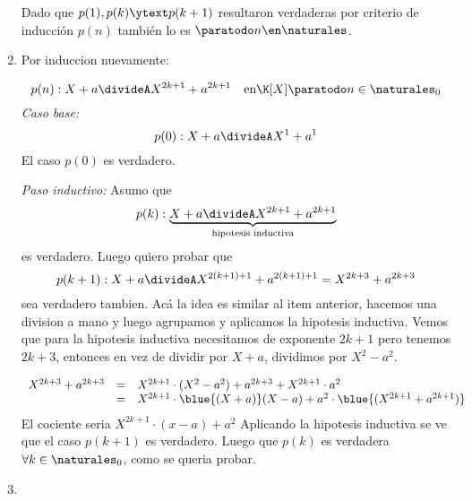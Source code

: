 \begin{enumerate}[label=\roman*)]
        \medskip

        Dado que $p(1), p(k) \ytext p(k+1)$ resultaron verdaderas por criterio de inducción $p(n)$ también lo es $\paratodo n \en \naturales$.

  \item Por induccion nuevamente:
  
          $$
           p(n): X + a \divideA X^{2k + 1} + a^{2k + 1} \quad \text{en} \K[X] \paratodo n \in \naturales_0
          $$
          \textit{Caso base:}
          $$
           p(0) : X + a \divideA X^1 + a^1
          $$
          El caso $p(0)$ es verdadero. 

          \textit{Paso inductivo: } 
          Asumo que
          $$
           p(k) : \underbrace{X + a \divideA X^{2k + 1} + a^{2k + 1}}_{\text{hipotesis inductiva}}
          $$
          es verdadero. Luego quiero probar que 
          $$
           p(k + 1) : X + a \divideA X^{2(k+1) + 1} + a^{2(k+1) + 1} = X^{2k + 3} + a^{2k + 3}
          $$
          sea verdadero tambien.
          Acá la idea es similar al item anterior, hacemos una division a mano y luego agrupamos y aplicamos la 
          hipotesis inductiva. Vemos que para la hipotesis inductiva necesitamos de exponente $2k + 1$ pero tenemos
          $2k + 3$, entonces en vez de dividir por $X + a$, dividimos por $X^2 - a^2$. 
          
          $$
          \begin{array}{rcl}
            X^{2k + 3} + a^{2k + 3} & = & X^{2k + 1}\cdot(X^2 - a^2) + a^{2k+3} + X^{2k + 1}\cdot a^2 \\
                                    & = & X^{2k + 1}\cdot\blue{(X + a)}(X - a) + a^2 \cdot \blue{(X^{2k + 1} + a^{2k + 1})}
          \end{array}
          $$
          El cociente seria $X^{2k + 1}\cdot (x-a) + a^2$
          Aplicando la hipotesis inductiva se ve que el caso $p(k+1)$ es verdadero. Luego 
          que $p(k)$ es verdadera $\forall k \in \naturales_0$, como se queria probar.
           
      
          

  \item \hacer

\end{enumerate}

\begin{aportes}
  \item {}
  \item {}
\end{aportes}
